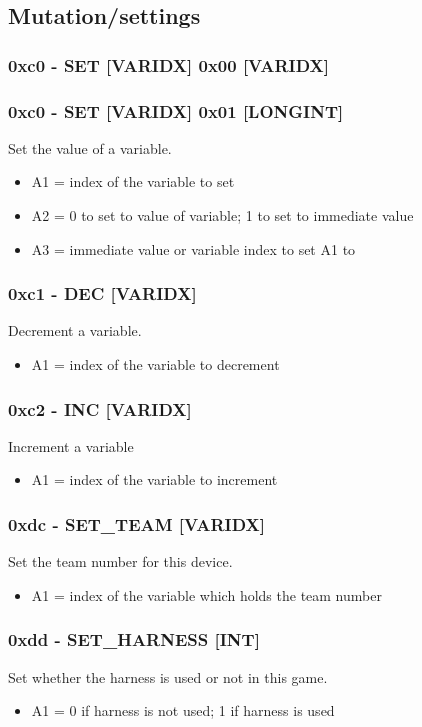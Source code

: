 \documentclass[12pt,a4paper]{scrbook}
\begin{document}
\subsection{Mutation/settings}

\subsubsection{0xc0 - SET [VARIDX] 0x00 [VARIDX]}
\subsubsection{0xc0 - SET [VARIDX] 0x01 [LONGINT]}
Set the value of a variable.
\begin{itemize}
\item A1 = index of the variable to set
\item A2 = 0 to set to value of variable; 1 to set to immediate value
\item A3 = immediate value or variable index to set A1 to
\end{itemize}

\subsubsection{0xc1 - DEC [VARIDX]}
Decrement a variable.
\begin{itemize}
\item A1 = index of the variable to decrement
\end{itemize}

\subsubsection{0xc2 - INC [VARIDX]}
Increment a variable
\begin{itemize}
\item A1 = index of the variable to increment
\end{itemize}

\subsubsection{0xdc - SET\_TEAM [VARIDX]}
Set the team number for this device.
\begin{itemize}
\item A1 = index of the variable which holds the team number
\end{itemize}

\subsubsection{0xdd - SET\_HARNESS [INT]}
Set whether the harness is used or not in this game.
\begin{itemize}
\item A1 = 0 if harness is not used; 1 if harness is used
\end{itemize}
\end{document}
